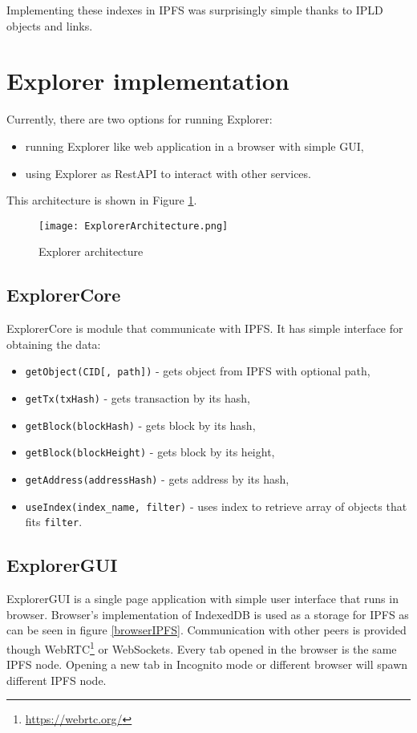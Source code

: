 Implementing these indexes in IPFS was surprisingly simple thanks to IPLD objects and links.


\section{Explorer implementation}
Currently, there are two options for running Explorer:
\begin{itemize}
    \item running Explorer like web application in a browser with simple GUI,
    \item using Explorer as RestAPI to interact with other services.
\end{itemize} 

This architecture is shown in Figure \ref{ExplorerArchitecture}.

\begin{figure}[h]
    \centering
    \texttt{[image: ExplorerArchitecture.png]}
    \caption{Explorer architecture}
    \label{ExplorerArchitecture}
\end{figure}

\subsection{ExplorerCore}
ExplorerCore is module that communicate with IPFS. It has simple interface for obtaining the data:
\begin{itemize}
    \item \texttt{getObject(CID[, path])} - gets object from IPFS with optional path,
    \item \texttt{getTx(txHash)} - gets transaction by its hash,
    \item \texttt{getBlock(blockHash)} - gets block by its hash,
    \item \texttt{getBlock(blockHeight)} - gets block by its height,
    \item \texttt{getAddress(addressHash)} - gets address by its hash,
    \item \texttt{useIndex(index\_name, filter)} - uses index to retrieve array of objects that fits \texttt{filter}.
\end{itemize}

\subsection{ExplorerGUI}
ExplorerGUI is a single page application with simple user interface that runs in browser. Browser's implementation of IndexedDB is used as a storage for IPFS as can be seen in figure \ref{browserIPFS}. Communication with other peers is provided though WebRTC\footnote{\url{https://webrtc.org/}} or WebSockets. Every tab opened in the browser is the same IPFS node. Opening a new tab in Incognito mode or different browser will spawn different IPFS node.

